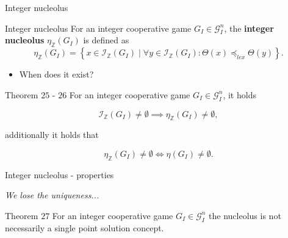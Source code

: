 \documentclass{beamer}
\newcommand{\Z}{\mathbb{Z}}
\begin{document}
\begin{frame}{Integer nucleolus}
    \pause

    \begin{block}{Integer nucleolus}
        For an integer cooperative game $G_I \in \mathcal{G}_I^n$, the \textbf{integer nucleolus} $\eta_\Z(G_I)$ is defined as
        \begin{displaymath}
            \eta_{\Z}(G_I) = \left\{ x \in \mathcal{I}_\Z(G_I) \mid \forall y \in \mathcal{I}_\Z(G_I): \Theta(x) \preceq_{lex} \Theta(y)\right\}.
        \end{displaymath}
    \end{block}

    \pause

    \begin{itemize}
        \item When does it exist?
    \end{itemize}

    \pause

    \begin{block}{Theorem $25$ - $26$}
        For an integer cooperative game $G_I \in \mathcal{G}_I^n$, it holds

        \begin{displaymath}
            \mathcal{I}_{\Z}(G_I) \neq \emptyset \implies \eta_\Z(G_I) \neq \emptyset,
        \end{displaymath}

        additionally it holds that

        \begin{displaymath}
            \eta_\Z(G_I) \neq \emptyset \iff \eta(G_I) \neq \emptyset.
        \end{displaymath}
    \end{block}
\end{frame}



\begin{frame}{Integer nucleolus - properties}
    \pause

    \textit{We lose the uniqueness...}

    \pause
    \begin{block}{Theorem $27$}
        For an integer cooperative game $G_I \in \mathcal{G}_I^n$ the nucleolus is not necessarily a single point solution concept.
    \end{block}
\end{frame}
\end{document}
